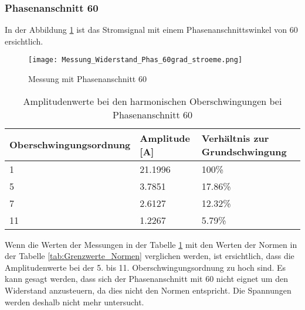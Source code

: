 \subsubsection*{Phasenanschnitt 60\textdegree}

In der Abbildung \ref{fig:Mess_Widerstand_Phas_60grad_stroeme} ist das Stromsignal mit einem Phasenanschnittswinkel von 60\textdegree \hspace{0.02cm} ersichtlich. 

\begin{figure}[ht!]
	\centering
	\texttt{[image: Messung\_Widerstand\_Phas\_60grad\_stroeme.png]}	
	\caption{Messung mit Phasenanschnitt 60\textdegree}\label{fig:Mess_Widerstand_Phas_60grad_stroeme}
\end{figure}


\begin{table}[ht!]
	\centering
	\begin{tabular}{|l|l|l|}
		\hline
		Oberschwingungsordnung & Amplitude [A] 	& Verhältnis zur Grundschwingung	\\ \hline
		1                      & 21.1996   		& 100\%								\\ \hline
		5                      & 3.7851    		& 17.86\%							\\ \hline
		7                      & 2.6127    		& 12.32\%							\\ \hline
		11                     & 1.2267    		& 5.79\%							\\ \hline
	\end{tabular}
	\caption{Amplitudenwerte bei den harmonischen Oberschwingungen bei Phasenanschnitt 60\textdegree}\label{tab:Phas_60_Stroeme}
\end{table}

Wenn die Werten der Messungen in der Tabelle \ref{tab:Phas_60_Stroeme} mit den Werten der Normen in der Tabelle \ref{tab:Grenzwerte_Normen} verglichen werden, ist ersichtlich, dass die Amplitudenwerte bei der 5. bis 11. Oberschwingungsordnung zu hoch sind. Es kann gesagt werden, dass sich der Phasenanschnitt mit 60\textdegree \hspace{0.02cm} nicht eignet um den Widerstand anzusteuern, da dies nicht den Normen entspricht. Die Spannungen werden deshalb nicht mehr untersucht. 


